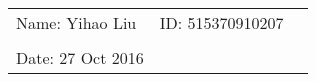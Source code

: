 \documentclass{article}
\begin{document}
\vspace*{0.25cm}

\hrulefill

\thispagestyle{empty}

\begin{center}
\begin{large}
\end{large}

\hrulefill

\vspace*{5cm}
\begin{Large}
\end{Large}

\vspace{2em}

\begin{large}
\end{large}
\end{center}


\vfill

\begin{table}[h!]
\flushleft
\begin{tabular}{lll}
Name: Yihao Liu \hspace*{2em}&
ID: 515370910207\hspace*{2em}\\


\\

Date: 27 Oct 2016 

\end{tabular}
\end{table}

\hfill
\begin{tiny}
[rev. 1.0]
\end{tiny}
\newpage
\end{document}
